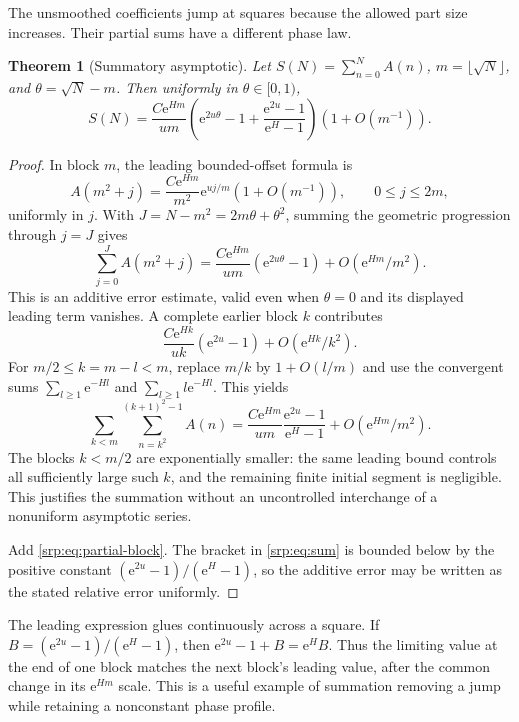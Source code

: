 \documentclass[11pt,a4paper]{article}
\numberwithin{equation}{section}
\newtheorem{theorem}{Theorem}[section]
\theoremstyle{definition}
\theoremstyle{remark}
\newcommand{\e}{\mathrm e}
\begin{document}
The unsmoothed coefficients jump at squares because the allowed part
size increases. Their partial sums have a different phase law.

\begin{theorem}[Summatory asymptotic]
\label{srp:thm:sum}
Let $S(N)=\sum_{n=0}^N A(n)$, $m=\lfloor\sqrt N\rfloor$, and
$\theta=\sqrt N-m$. Then uniformly in $\theta\in[0,1)$,
\begin{equation}
 S(N)=\frac{C\e^{Hm}}{u m}
 \left(\e^{2u\theta}-1+
       \frac{\e^{2u}-1}{\e^H-1}\right)
 \left(1+O(m^{-1})\right).
 \label{srp:eq:sum}
\end{equation}
\end{theorem}
\begin{proof}
In block $m$, the leading bounded-offset formula is
\[
 A(m^2+j)=\frac{C\e^{Hm}}{m^2}\e^{uj/m}(1+O(m^{-1})),
 \qquad 0\le j\le2m,
\]
uniformly in $j$. With $J=N-m^2=2m\theta+\theta^2$, summing the geometric
progression through $j=J$ gives
\begin{equation}
 \sum_{j=0}^{J}A(m^2+j)
 =\frac{C\e^{Hm}}{u m}(\e^{2u\theta}-1)
   +O(\e^{Hm}/m^2).
 \label{srp:eq:partial-block}
\end{equation}
This is an additive error estimate, valid even when $\theta=0$ and its
displayed leading term vanishes. A complete earlier block $k$ contributes
\[
 \frac{C\e^{Hk}}{u k}(\e^{2u}-1)
 +O(\e^{Hk}/k^2).
\]
For $m/2\le k=m-l<m$, replace $m/k$ by $1+O(l/m)$ and use the convergent
sums $\sum_{l\ge1}\e^{-Hl}$ and $\sum_{l\ge1}l\e^{-Hl}$. This yields
\[
 \sum_{k<m}\sum_{n=k^2}^{(k+1)^2-1}A(n)
 =\frac{C\e^{Hm}}{u m}\frac{\e^{2u}-1}{\e^H-1}
  +O(\e^{Hm}/m^2).
\]
The blocks $k<m/2$ are exponentially smaller: the same leading bound
controls all sufficiently large such $k$, and the remaining finite
initial segment is negligible. This justifies the summation without an
uncontrolled interchange of a nonuniform asymptotic series.

Add \eqref{srp:eq:partial-block}. The bracket in \eqref{srp:eq:sum} is bounded
below by the positive constant $(\e^{2u}-1)/(\e^H-1)$, so the additive
error may be written as the stated relative error uniformly.
\end{proof}

The leading expression glues continuously across a square. If
$B=(\e^{2u}-1)/(\e^H-1)$, then
$\e^{2u}-1+B=\e^H B$. Thus the limiting value at the end of one block
matches the next block's leading value, after the common change in its
$\e^{Hm}$ scale. This is a useful example of summation removing a jump
while retaining a nonconstant phase profile.
\end{document}

